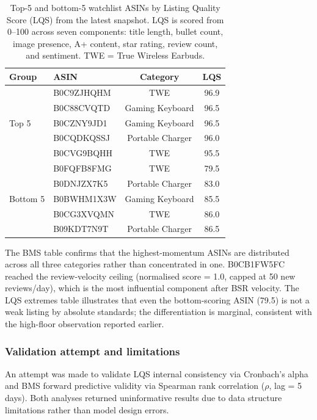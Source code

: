 \begin{table}[H]
  \centering
  \small
  \begin{tabular}{llcc}
    \toprule
    \textbf{Group} & \textbf{ASIN} & \textbf{Category} & \textbf{LQS} \\
    \midrule
    \multirow{5}{*}{Top 5}
      & B0C9ZJHQHM & TWE              & 96.9 \\
      & B0C88CVQTD & Gaming Keyboard  & 96.5 \\
      & B0CZNY9JD1 & Gaming Keyboard  & 96.5 \\
      & B0CQDKQSSJ & Portable Charger & 96.0 \\
      & B0CVG9BQHH & TWE              & 95.5 \\
    \midrule
    \multirow{5}{*}{Bottom 5}
      & B0FQFB8FMG & TWE              & 79.5 \\
      & B0DNJZX7K5 & Portable Charger & 83.0 \\
      & B0BWHM1X3W & Gaming Keyboard  & 85.5 \\
      & B0CG3XVQMN & TWE              & 86.0 \\
      & B09KDT7N9T & Portable Charger & 86.5 \\
    \bottomrule
  \end{tabular}
  \caption{Top-5 and bottom-5 watchlist ASINs by Listing Quality Score (LQS) from the latest snapshot. LQS is scored from 0--100 across seven components: title length, bullet count, image presence, A+ content, star rating, review count, and sentiment. TWE = True Wireless Earbuds.}
  \label{tab:lqs_extremes}
\end{table}

The BMS table confirms that the highest-momentum ASINs are distributed across all three categories rather than concentrated in one. B0CB1FW5FC reached the review-velocity ceiling (normalised score = 1.0, capped at 50 new reviews/day), which is the most influential component after BSR velocity. The LQS extremes table illustrates that even the bottom-scoring ASIN (79.5) is not a weak listing by absolute standards; the differentiation is marginal, consistent with the high-floor observation reported earlier.

\subsubsection*{Validation attempt and limitations}

An attempt was made to validate LQS internal consistency via Cronbach's alpha
and BMS forward predictive validity via Spearman rank correlation
($\rho$, lag = 5 days). Both analyses returned uninformative results due to
data structure limitations rather than model design errors.

